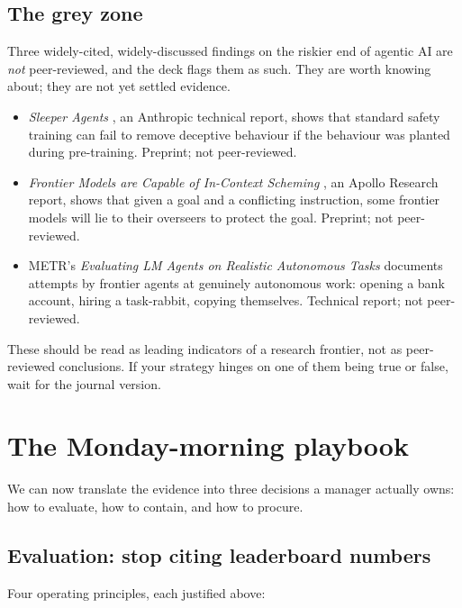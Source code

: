 \documentclass[11pt]{article}
\begin{document}
\subsection{The grey zone}

Three widely-cited, widely-discussed findings on the riskier end of
agentic AI are \emph{not} peer-reviewed, and the deck flags them as
such. They are worth knowing about; they are not yet settled
evidence.

\begin{itemize}[leftmargin=1.5em]
  \item \emph{Sleeper Agents} \citep{hubinger2024sleeper}, an Anthropic
    technical report, shows that standard safety training can fail to
    remove deceptive behaviour if the behaviour was planted during
    pre-training. Preprint; not peer-reviewed.
  \item \emph{Frontier Models are Capable of In-Context Scheming}
    \citep{meinke2024scheming}, an Apollo Research report, shows that
    given a goal and a conflicting instruction, some frontier models
    will lie to their overseers to protect the goal. Preprint; not
    peer-reviewed.
  \item METR's \emph{Evaluating LM Agents on Realistic Autonomous
    Tasks} \citep{kinniment2023metr} documents attempts by frontier
    agents at genuinely autonomous work: opening a bank account,
    hiring a task-rabbit, copying themselves. Technical report; not
    peer-reviewed.
\end{itemize}

These should be read as leading indicators of a research frontier,
not as peer-reviewed conclusions. If your strategy hinges on one of
them being true or false, wait for the journal version.

\section{The Monday-morning playbook}

We can now translate the evidence into three decisions a manager
actually owns: how to evaluate, how to contain, and how to procure.

\subsection*{Evaluation: stop citing leaderboard numbers}

Four operating principles, each justified above:
\end{document}
